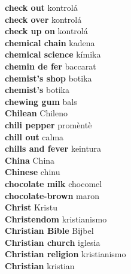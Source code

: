 \textbf{ check out  } kontrolá \\
\textbf{ check over  } kontrolá \\
\textbf{ check up on  } kontrolá \\
\textbf{ chemical chain  } kadena \\
\textbf{ chemical science  } kímika \\
\textbf{ chemin de fer  } baccarat \\
\textbf{ chemist’s shop  } botika \\
\textbf{ chemist’s  } botika \\
\textbf{ chewing gum  } bals \\
\textbf{ Chilean  } Chileno \\
\textbf{ chili pepper  } promèntè \\
\textbf{ chill out  } calma \\
\textbf{ chills and fever  } keintura \\
\textbf{ China  } China \\
\textbf{ Chinese  } chinu \\
\textbf{ chocolate milk  } chocomel \\
\textbf{ chocolate-brown  } maron \\
\textbf{ Christ  } Kristu \\
\textbf{ Christendom  } kristianismo \\
\textbf{ Christian Bible  } Bijbel \\
\textbf{ Christian church  } iglesia \\
\textbf{ Christian religion  } kristianismo \\
\textbf{ Christian  } kristian \\
